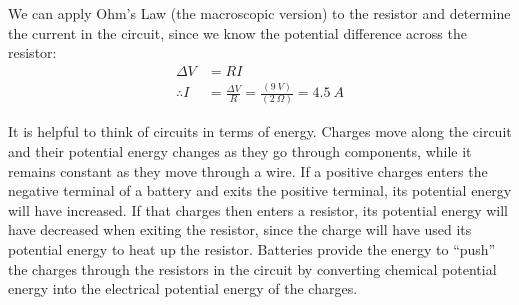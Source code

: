 We can apply Ohm's Law (the macroscopic version) to the resistor and determine the current in the circuit, since we know the potential difference across the resistor:
\begin{align*}
\Delta V&=RI\\
\therefore I&=\frac{\Delta V}{R}=\frac{(\SI{9}{V})}{(\SI{2}{\Omega})}=\SI{4.5}{A}
\end{align*}

It is helpful to think of circuits in terms of energy. Charges move along the circuit and their potential energy changes as they go through components, while it remains constant as they move through a wire. If a positive charges enters the negative terminal of a battery and exits the positive terminal, its potential energy will have increased. If that charges then enters a resistor, its potential energy will have decreased when exiting the resistor, since the charge will have used its potential energy to heat up the resistor. Batteries provide the energy to ``push'' the charges through the resistors in the circuit by converting chemical potential energy into the electrical potential energy of the charges.

